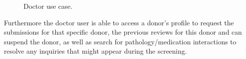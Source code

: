\begin{figure}[h]
	\begin{center}
	\end{center}
	\caption{Doctor use case.}\label{fig:doctor_use_case}
\end{figure}

Furthermore the doctor user is able to access a donor's profile to request the submissions for that specific donor, the previous reviews for this donor and can suspend the donor, as well as search for pathology/medication interactions to resolve any inquiries that might appear during the screening.

\pagebreak

